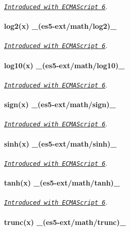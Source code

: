 \href{http://people.mozilla.org/~jorendorff/es6-draft.html#sec-math.log1p}{\tt {\itshape Introduced with E\+C\+M\+A\+Script 6}}. ~\newline
 \paragraph*{log2(x) \+\_\+(es5-\/ext/math/log2)\+\_\+}

\href{http://people.mozilla.org/~jorendorff/es6-draft.html#sec-math.log2}{\tt {\itshape Introduced with E\+C\+M\+A\+Script 6}}. ~\newline
 \paragraph*{log10(x) \+\_\+(es5-\/ext/math/log10)\+\_\+}

\href{http://people.mozilla.org/~jorendorff/es6-draft.html#sec-math.log10}{\tt {\itshape Introduced with E\+C\+M\+A\+Script 6}}. ~\newline
 \paragraph*{sign(x) \+\_\+(es5-\/ext/math/sign)\+\_\+}

\href{http://people.mozilla.org/~jorendorff/es6-draft.html#sec-math.sign}{\tt {\itshape Introduced with E\+C\+M\+A\+Script 6}}. ~\newline
 \paragraph*{sinh(x) \+\_\+(es5-\/ext/math/sinh)\+\_\+}

\href{http://people.mozilla.org/~jorendorff/es6-draft.html#sec-math.sinh}{\tt {\itshape Introduced with E\+C\+M\+A\+Script 6}}. ~\newline
 \paragraph*{tanh(x) \+\_\+(es5-\/ext/math/tanh)\+\_\+}

\href{http://people.mozilla.org/~jorendorff/es6-draft.html#sec-math.tanh}{\tt {\itshape Introduced with E\+C\+M\+A\+Script 6}}. ~\newline
 \paragraph*{trunc(x) \+\_\+(es5-\/ext/math/trunc)\+\_\+}

